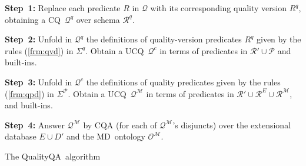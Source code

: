 \documentclass[format=acmsmall, review=false, screen=true]{acmart}
\newcommand{\ignore}[1]{}
\newcommand{\cq}{CQ}
\newcommand{\ucq}{UCQ}
\newcommand{\mc}[1]{\mathcal{ #1}}
\newcommand{\bl}[1]{#1}
\newcommand{\da}{Datalog}
\newcommand{\CQQA}{{\sf QualityQA}}
\newcommand{\qa}{QA}
\newcommand{\md}{MD}
\newcommand{\red}[1]{{#1}}
\begin{document}
  \ignore{More complex rules \red{than non-recursive \da \ } in $\Sigma^\mc{P}$ and $\Sigma^q$ require different \qa \ approaches, that might affect other steps. In particular, $\mc{Q}^\mc{M}$ in Step~4 might be a more complex query \red{than} a \ucq, for which \qa \ \red{may} not be done by \red{just} answering \cq s \red{over} $\mc{O}^\mc{M}$, in addition to $D'$ and \bl{$E$}.}

\ignore{Regarding \qa \ under $\mc{O}^\mc{M}$ in Step~4, we \red{can} use the algorithm in~\cite{milani16rr-cali,milani16rr}. This algorithm is a chase-based \qa \ algorithm that imposes \cq s on a canonical model that represents multiple models of the ontology. This means, in general, there are multiple clean instances, $\mc{D}^q$, for which we implicitly use certain answers for quality query answering, by utilizing the \qa \ algorithm under the \md \ ontology in \CQQA.}








\vspace{3mm}
\begin{algorithm}[t]
{\bf Step~1:} Replace each predicate $R$ in $\mc{Q}$ with its corresponding quality version $R^q$, obtaining a \cq \ $\mc{Q}^q$ over schema $\mc{R}^q$.

\vspace{2mm}
{\bf Step~2:} Unfold in $\mc{Q}^q$ the definitions of quality-version predicates $R^q$ given by the rules (\ref{frm:qvd}) in $\Sigma^q$.  Obtain a  \ucq \ $\mc{Q}^c$ in terms of predicates in $\mc{R}'\cup\mc{P}$ and built-ins.

\vspace{2mm}
{\bf Step~3:} Unfold in $\mc{Q}^c$ the definitions of quality predicates given by the rules  (\ref{frm:qpd}) in $\Sigma^\mc{P}$. Obtain a \ucq \ $\mc{Q}^\mc{M}$ in terms of predicates in $\mc{R}'\cup\bl{\mc{R}^E}\cup\mc{R}^\mc{M}$, and built-ins.

\vspace{2mm}
{\bf Step~4:} Answer $\mc{Q}^\mc{M}$ by CQA (for each of $\mc{Q}^\mc{M}$'s disjuncts) over the extensional database $E \cup D'$ and  the \md \ ontology $\mc{O}^\mc{M}$.
\caption{The \CQQA \ algorithm }
\label{ag:qualityalg}
\end{algorithm}
\end{document}
